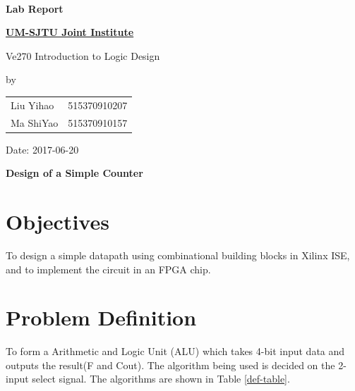 \documentclass{article}
\date{}
\begin{document}
\vspace*{3mm}

\begin{minipage}{0.6\linewidth}
\ 
\end{minipage}
\hfill
\begin{minipage}{0.38\linewidth}
\begin{center}
\huge\bfseries
Lab Report \\[8mm]
\fontsize{100pt}{\baselineskip}
\end{center}
\end{minipage}

\vspace*{1cm}

{\huge\bfseries
\uline{UM-SJTU Joint Institute \phantom{xxxxxxxxxxxx}}
\vspace*{2mm}

Ve270 Introduction to Logic Design
}	

\vspace*{2cm}
\begin{center}
\LARGE
by \\[2mm]
\begin{tabular}{ll}
Liu Yihao & 515370910207 \\
Ma ShiYao & 515370910157
\end{tabular}

\vspace*{2cm}
Date: 2017-06-20
\end{center}

\vspace*{2cm}
\begin{center}
\Huge\bfseries
Design of a Simple Counter
\end{center}

\newpage

\section{Objectives}
To design a simple datapath using combinational building blocks in Xilinx ISE, and to implement the circuit in an FPGA chip.

\section{Problem Definition}
To form a Arithmetic and Logic Unit (ALU) which takes 4-bit input data and outputs the result(F and Cout). The algorithm being used is decided on the 2-input select signal. The algorithms are shown in Table \ref{def-table}.
\end{document}
